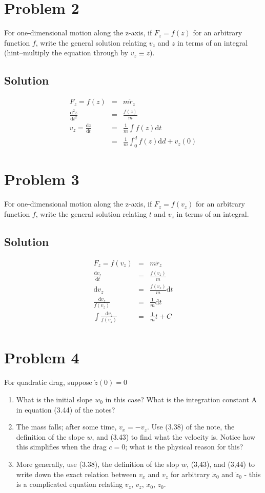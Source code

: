\documentclass[aps,prl,reprint]{revtex4-1}
\newcommand{\de}{\mathrm{d}}
\begin{document}
\section{Problem 2}
For one-dimensional motion along the z-axis, if $F_z = f(z)$ for an arbitrary function $f$, write the general solution relating $v_z$ and $z$ in terms of an integral (hint–multiply the equation through by $v_z \equiv \dot{z}$).
\subsection{Solution}
\begin{eqnarray*}
F_z = f(z) &=& m\ddot{r}_z \\
\frac{\de^2 z}{\de t^2} &=& \frac{f(z)}{m} \\
v_z = \frac{\de z}{\de t} &=& \frac{1}{m}\int f(z)\de t \\
&=& \frac{1}{m}\int_0^d f(z)\de d + v_z(0)
\end{eqnarray*}
\section{Problem 3}
For one-dimensional motion along the z-axis, if $F_z = f(v_z)$ for an arbitrary function $f$, write the general solution relating $t$ and $v_z$ in terms of an integral.
\subsection{Solution}
\begin{eqnarray*}
F_z = f(v_z) &=& m\ddot{r}_z \\
\frac{\de v_z}{\de t} &=& \frac{f(v_z)}{m} \\
\de v_z &=& \frac{f(v_z)}{m}\de t \\
\frac{\de v_z}{f(v_z)} &=& \frac{1}{m} \de t \\
\int \frac{\de v_z}{f(v_z)} &=& \frac{1}{m} t + C \\
\end{eqnarray*}
\section{Problem 4}
For quadratic drag, suppose $\dot{z}(0) = 0$
\begin{enumerate}
    \item What is the initial slope $w_0$ in this case? What is the integration constant A in equation (3.44) of the notes?
    \item The mass falls; after some time, $v_x = -v_z$. Use (3.38) of the note, the definition of the slope $w$, and (3.43) to find what the velocity is. Notice how this simplifies when the drag $c = 0$; what is the physical reason for this?
    \item More generally, use (3.38), the definition of the slop $w$, (3,43), and (3,44) to write down the exact relation between $v_x$ and $v_z$ for arbitrary $\dot{x}_0$ and $\dot{z}_0$ - this is a complicated equation relating $v_z$, $v_z$, $\dot{x}_0$, $\dot{z}_0$.
\end{enumerate}
\end{document}
